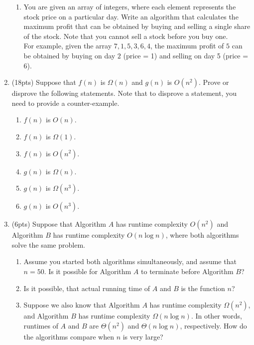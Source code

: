 \documentclass{article}
\begin{document}
\begin{enumerate}
\begin{enumerate}
\item You are given an array of integers, where each element represents the stock price on a particular day. Write an algorithm that calculates the maximum profit that can be obtained by buying and selling a single share of the stock. Note that you cannot sell a stock before you buy one.\\
For example, given the array $7, 1, 5, 3, 6, 4$, the maximum profit of $5$ can be obtained by buying on day $2$ (price = 1) and selling on day 5 (price = 6).
\end{enumerate}



\item(18pts) Suppose that $f(n)$ is $\Omega(n)$ and $g(n)$ is $O(n^2)$. Prove or disprove the following statements. Note that to disprove a statement, you need to provide a counter-example.
\begin{enumerate}
\item $f(n)$ is $O(n)$.
\item $f(n)$ is $\Omega(1)$.
\item $f(n)$ is $O(n^2)$.
\item $g(n)$ is $\Omega(n)$.
\item $g(n)$ is $\Omega(n^3)$.
\item $g(n)$ is $O(n^3)$.
\end{enumerate}



\item(6pts) Suppose that Algorithm $A$ has runtime complexity $O(n^2)$ and Algorithm $B$ has runtime complexity $O(n \log n)$, where both algorithms solve the same problem.

\begin{enumerate}
\item Assume you started both algorithms simultaneously, and assume that $n=50$. Is it possible for Algorithm $A$ to terminate before Algorithm $B$?
\item Is it possible, that actual running time of $A$ and $B$ is the function $n$?
\item Suppose we also know that Algorithm $A$ has runtime complexity $\Omega(n^2)$, and Algorithm $B$ has runtime complexity $\Omega(n \log n)$. In other words, runtimes of $A$ and $B$ are $\Theta(n^2)$ and $\Theta(n \log n)$, respectively. How do the algorithms compare when $n$ is very large?
\end{enumerate}




\end{enumerate}
\end{document}

